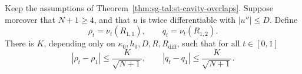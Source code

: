 \begin{theorem}\label{thm:sg-tal:st-lemma-3211}
  \leanok
Keep the assumptions of Theorem~\ref{thm:sg-tal:st-cavity-overlaps}.
Suppose moreover that $N+1\ge4$, and that $u$ is twice differentiable with $|u''|\le D$. Define
\[
\rho_t=\nu_t(R_{1,1}),\qquad q_t=\nu_t(R_{1,2}).
\]
There is $K$, depending only on $\kappa_0,h_0,D,R,R_{\mathrm{diff}}$, such that for all $t\in[0,1]$
\[
|\rho_t-\rho_1|\le\frac K{\sqrt{N+1}},\qquad|q_t-q_1|\le\frac K{\sqrt{N+1}} .
\]
\end{theorem}
